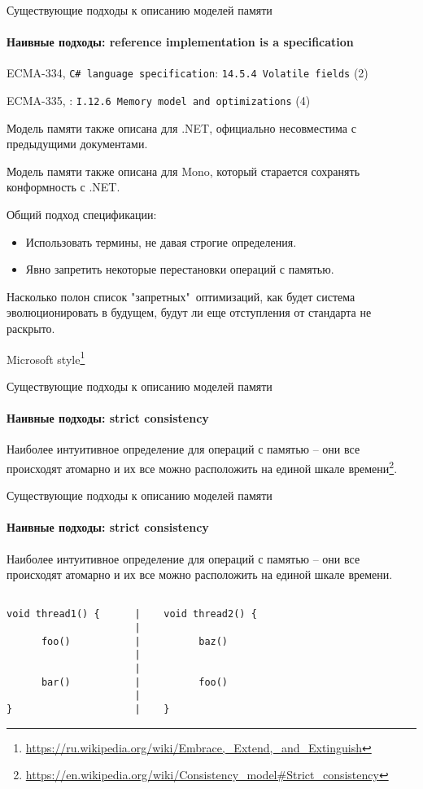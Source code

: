 \begin{frame}[t,noframenumbering]{Существующие подходы к описанию моделей памяти}
\framesubtitle{Наивные подходы: reference implementation is a specification}

{\small
ECMA-334, \texttt{C\# language specification}: \texttt{14.5.4 Volatile fields} (2)
}

{\small
ECMA-335, : \texttt{I.12.6 Memory model and optimizations} (4)
}

Модель памяти также описана для .NET, официально несовместима с предыдущими документами.

Модель памяти также описана для Mono, который старается сохранять конформность с .NET.

Общий подход спецификации:
\begin{itemize}
	\item Использовать термины, не давая строгие определения.
	\item Явно запретить некоторые перестановки операций с памятью.
\end{itemize}

Насколько полон список "запретных"\ оптимизаций, как будет система эволюционировать в будущем, будут ли еще отступления от стандарта не раскрыто.

Microsoft style\footnote{\url{https://ru.wikipedia.org/wiki/Embrace,_Extend,_and_Extinguish}}
\end{frame}


\begin{frame}[fragile, t]{Существующие подходы к описанию моделей памяти}
\framesubtitle{Наивные подходы: strict consistency}

Наиболее интуитивное определение для операций с памятью -- они все происходят атомарно и их все можно расположить на единой шкале времени\footnote{\tiny\url{https://en.wikipedia.org/wiki/Consistency_model#Strict_consistency}}.

\end{frame}


\begin{frame}{Существующие подходы к описанию моделей памяти}
\framesubtitle{Наивные подходы: strict consistency}

Наиболее интуитивное определение для операций с памятью -- они все происходят атомарно и их все можно расположить на единой шкале времени.


\begin{lstlisting}

void thread1() {      |    void thread2() {                                   
                      |
      foo()           |          baz()                           
                      |
                      |
      bar()           |          foo()                           
                      |
}                     |    }                    
\end{lstlisting}
\end{frame}

